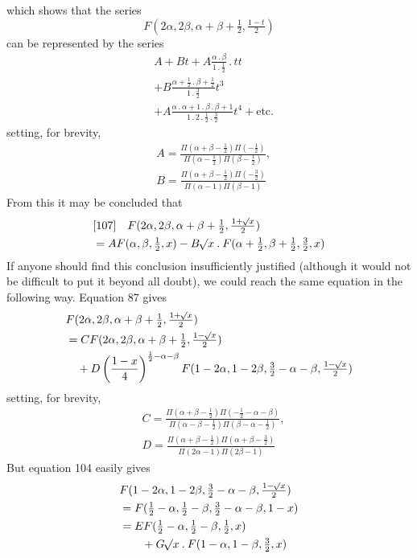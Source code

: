 which shows that the series
\[
F(2\alpha,2\beta,\alpha+\beta+\tfrac12,\tfrac{1-t}2)
\]
can be represented by the series
\[
\begin{aligned}&A+Bt+A\frac{\alpha\mathbin{.}\beta}{1\mathbin{.}\tfrac12}\mathbin{.}tt\\&+B\frac{\alpha+\tfrac12\mathbin{.}\beta+\tfrac12}{1\mathbin{.}\tfrac32}t^3\\&+A\frac{\alpha\mathbin{.}\alpha+1\mathbin{.}\beta\mathbin{.}\beta+1}{1\mathbin{.}2\mathbin{.}\tfrac12\mathbin{.}\tfrac32}t^4+\text{etc.}\end{aligned}
\]
setting, for brevity,
\[
\begin{aligned}&A=\frac{\Pi(\alpha+\beta-\tfrac12)\Pi(-\tfrac12)}{\Pi(\alpha-\tfrac12)\Pi(\beta-\tfrac12)},\\&
B=\frac{\Pi(\alpha+\beta-\tfrac12)\Pi(-\tfrac32)}{\Pi(\alpha-1)\Pi(\beta-1)}\end{aligned}
\]
From this it may be concluded that
\[
\begin{aligned}&[107]\quad F(2\alpha,2\beta,\alpha+\beta+\tfrac12,\tfrac{1+\mathord{{}^{}\!\surd}x}2)\\&=AF(\alpha,\beta,\tfrac12,x)-B\mathord{{}^{}\!\surd}x\mathbin{.}F(\alpha+\tfrac12,\beta+\tfrac12,\tfrac32,x)\end{aligned}
\]
If anyone should find this conclusion insufficiently justified (although it would not be difficult to put it beyond all doubt), we could reach the same equation in the following way. Equation 87 gives
\[
\begin{aligned}
&F(2\alpha,2\beta,\alpha+\beta+\tfrac12,\tfrac{1+\mathord{{}^{}\!\surd}x}2)\\&=CF(2\alpha,2\beta,\alpha+\beta+\tfrac12,\tfrac{1-\mathord{{}^{}\!\surd}x}2)\\
&\quad+D\left(\frac{1-x}4\right)^{\frac12-\alpha-\beta}F(1-2\alpha,1-2\beta,\tfrac32-\alpha-\beta,\tfrac{1-\mathord{{}^{}\!\surd}x}2)
\end{aligned}
\]
setting, for brevity,
\[
\begin{aligned}&C=\frac{\Pi(\alpha+\beta-\tfrac12)\Pi(-\tfrac12-\alpha-\beta)}{\Pi(\alpha-\beta-\tfrac12)\Pi(\beta-\alpha-\tfrac12)},\\&
D=\frac{\Pi(\alpha+\beta-\tfrac12)\Pi(\alpha+\beta-\tfrac32)}{\Pi(2\alpha-1)\Pi(2\beta-1)}\end{aligned}
\]
But equation 104 easily gives
\[
\begin{aligned}
&F(1-2\alpha,1-2\beta,\tfrac32-\alpha-\beta,\tfrac{1-\mathord{{}^{}\!\surd}x}2)\\&=F(\tfrac12-\alpha,\tfrac12-\beta,\tfrac32-\alpha-\beta,1-x)\\
&=EF(\tfrac12-\alpha,\tfrac12-\beta,\tfrac12,x)\\&\qquad+G\mathord{{}^{}\!\surd}x\mathbin{.}F(1-\alpha,1-\beta,\tfrac32,x)
\end{aligned}
\]
